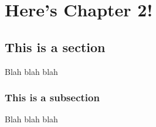 \chapter{Here's Chapter 2!} \label{chap:something_cool}

\section{This is a section}

Blah blah blah

\subsection{This is a subsection}

Blah blah blah

